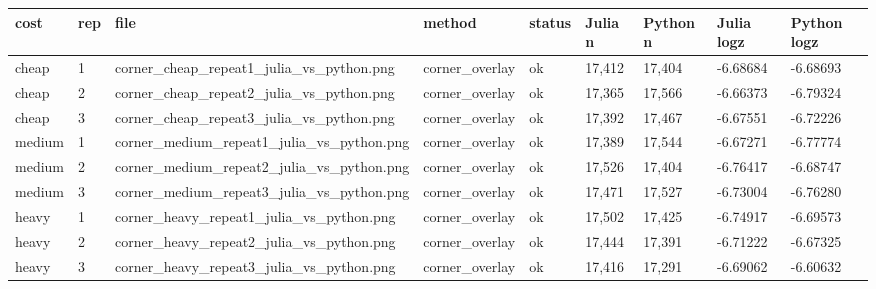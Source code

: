 \begin{tabular}{lllllllll}
\toprule
cost & rep & file & method & status & Julia n & Python n & Julia logz & Python logz \\
\midrule
cheap & 1 & corner\_cheap\_repeat1\_julia\_vs\_python.png & corner\_overlay & ok & 17,412 & 17,404 & -6.68684 & -6.68693 \\
cheap & 2 & corner\_cheap\_repeat2\_julia\_vs\_python.png & corner\_overlay & ok & 17,365 & 17,566 & -6.66373 & -6.79324 \\
cheap & 3 & corner\_cheap\_repeat3\_julia\_vs\_python.png & corner\_overlay & ok & 17,392 & 17,467 & -6.67551 & -6.72226 \\
medium & 1 & corner\_medium\_repeat1\_julia\_vs\_python.png & corner\_overlay & ok & 17,389 & 17,544 & -6.67271 & -6.77774 \\
medium & 2 & corner\_medium\_repeat2\_julia\_vs\_python.png & corner\_overlay & ok & 17,526 & 17,404 & -6.76417 & -6.68747 \\
medium & 3 & corner\_medium\_repeat3\_julia\_vs\_python.png & corner\_overlay & ok & 17,471 & 17,527 & -6.73004 & -6.76280 \\
heavy & 1 & corner\_heavy\_repeat1\_julia\_vs\_python.png & corner\_overlay & ok & 17,502 & 17,425 & -6.74917 & -6.69573 \\
heavy & 2 & corner\_heavy\_repeat2\_julia\_vs\_python.png & corner\_overlay & ok & 17,444 & 17,391 & -6.71222 & -6.67325 \\
heavy & 3 & corner\_heavy\_repeat3\_julia\_vs\_python.png & corner\_overlay & ok & 17,416 & 17,291 & -6.69062 & -6.60632 \\
\bottomrule
\end{tabular}
